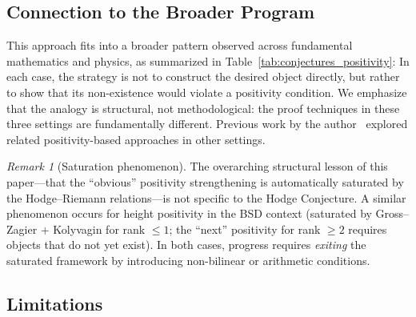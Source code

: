 \documentclass[aps,prd,twocolumn,superscriptaddress,nofootinbib]{revtex4-2}
\theoremstyle{definition}
\theoremstyle{remark}
\newtheorem{remark}[theorem]{Remark}
\begin{document}
\subsection{Connection to the Broader Program}

This approach fits into a broader pattern observed across fundamental mathematics and physics, as summarized in Table~\ref{tab:conjectures_positivity}:
In each case, the strategy is not to construct the desired object directly, but rather to show that its non-existence would violate a positivity condition. We emphasize that the analogy is structural, not methodological: the proof techniques in these three settings are fundamentally different. Previous work by the author~\cite{GeigerRH2026c, FST-Unified2026} explored related positivity-based approaches in other settings.

\begin{remark}[Saturation phenomenon]
\label{rem:meta-pattern-saturation}
The overarching structural lesson of this paper---that the ``obvious'' positivity strengthening is automatically saturated by the Hodge--Riemann relations---is not specific to the Hodge Conjecture. A similar phenomenon occurs for height positivity in the BSD context (saturated by Gross--Zagier + Kolyvagin for rank $\leq 1$; the ``next'' positivity for rank $\geq 2$ requires objects that do not yet exist). In both cases, progress requires \emph{exiting} the saturated framework by introducing non-bilinear or arithmetic conditions.
\end{remark}

\subsection{Limitations}
\end{document}
